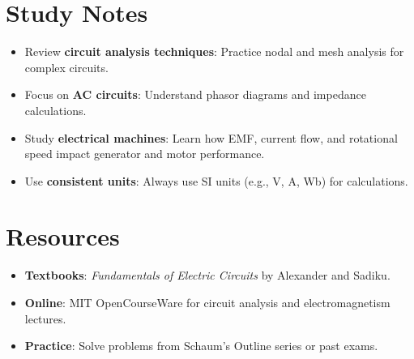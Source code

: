 \documentclass[12pt]{article}
\begin{document}
\section{Study Notes}
\begin{itemize}
    \item Review \textbf{circuit analysis techniques}: Practice nodal and mesh analysis for complex circuits.
    \item Focus on \textbf{AC circuits}: Understand phasor diagrams and impedance calculations.
    \item Study \textbf{electrical machines}: Learn how EMF, current flow, and rotational speed impact generator and motor performance.
    \item Use \textbf{consistent units}: Always use SI units (e.g., \si{\volt}, \si{\ampere}, \si{\weber}) for calculations.
\end{itemize}

\section{Resources}
\begin{itemize}
    \item \textbf{Textbooks}: \textit{Fundamentals of Electric Circuits} by Alexander and Sadiku.
    \item \textbf{Online}: MIT OpenCourseWare for circuit analysis and electromagnetism lectures.
    \item \textbf{Practice}: Solve problems from Schaum's Outline series or past exams.
\end{itemize}
\end{document}
